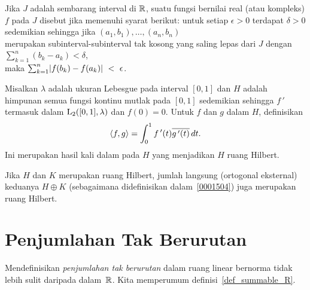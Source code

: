 \begin{defn} Jika $J$ adalah sembarang interval di $\mathbb{R}$, suatu fungsi bernilai real (atau kompleks) $f$ pada $J$ disebut
 jika memenuhi syarat berikut:
  \quote untuk setiap $\epsilon > 0$ terdapat $\delta > 0$ sedemikian
 sehingga jika $(a_1,b_1), \dots,(a_n,b_n)$ \\
 merupakan subinterval-subinterval tak kosong yang saling lepas dari $J$ dengan $\sum_{k=1}^n(b_k - a_k) < \delta$, \\
 maka $\sum_{k=1}^n\lvert f(b_k) - f(a_k)\rvert~<~\epsilon$.
  \endquote
\end{defn}

\begin{exam}\label{exam_Hsp_abs_cont} Misalkan $\lambda$ adalah ukuran Lebesgue pada interval $[0,1]$ dan $H$ adalah himpunan semua
fungsi kontinu mutlak pada $[0,1]$ sedemikian sehingga $f\,'$ termasuk dalam $\mathrm{L_{2}}([0,1],\lambda)$ dan $f(0) = 0$.
Untuk $f$ dan $g$ dalam $H$, definisikan
   \[ \langle f,g \rangle = \int_0^1 f\,'(t)\overline{g\,'(t)}\,dt. \]
Ini merupakan hasil kali dalam pada $H$ yang menjadikan $H$ ruang Hilbert.
\end{exam}

\begin{exam} Jika $H$ dan $K$ merupakan ruang Hilbert, jumlah langsung (ortogonal eksternal) keduanya $H \oplus K$
(sebagaimana didefinisikan dalam~\ref{0001504}) juga merupakan ruang Hilbert.
\end{exam}


















\section{Penjumlahan Tak Berurutan}

Mendefinisikan \emph{penjumlahan tak berurutan} dalam ruang linear bernorma tidak lebih sulit daripada dalam~$\mathbb{R}$.  Kita memperumum
definisi~\ref{def_summable_R}.

